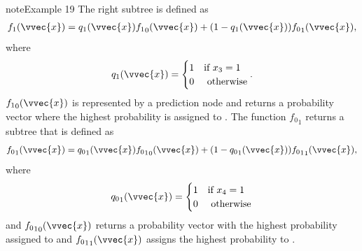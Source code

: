 \documentclass[letterpaper,10pt,english]{jupyterBook}
\begin{document}
\begin{sphinxadmonition}{note}{Example 19}
\sphinxAtStartPar
The right subtree is defined as
\begin{equation*}
\begin{split}f_1(\vvec{x})=q_1(\vvec{x}){f_1}_0(\vvec{x})+(1-q_1(\vvec{x})){f_0}_1(\vvec{x}),\end{split}
\end{equation*}
where
\begin{equation*}
\begin{split}q_1(\vvec{x})=\begin{cases}1 & \text{if }x_3=1\\0 & \text{ otherwise}\end{cases}.\end{split}
\end{equation*}
\({f_1}_0(\vvec{x})\) is represented by a prediction node and returns a probability vector where the highest probability is assigned to . The function \({f_0}_1\) returns a subtree that is defined as
\begin{equation*}
\begin{split}{f_0}_1(\vvec{x})={q_0}_1(\vvec{x}){{f_0}_1}_0(\vvec{x})+(1-{q_0}_1(\vvec{x})){{f_0}_1}_1(\vvec{x}),\end{split}
\end{equation*}
where
\begin{equation*}
\begin{split}{q_0}_1(\vvec{x})=\begin{cases}1 & \text{if }x_4=1\\0 & \text{ otherwise}\end{cases}\end{split}
\end{equation*}
and \({{f_0}_1}_0(\vvec{x})\) returns a probability vector with the highest probability assigned to  and \({{f_0}_1}_1(\vvec{x})\) assigns the highest probability to .
\end{sphinxadmonition}
\end{document}
